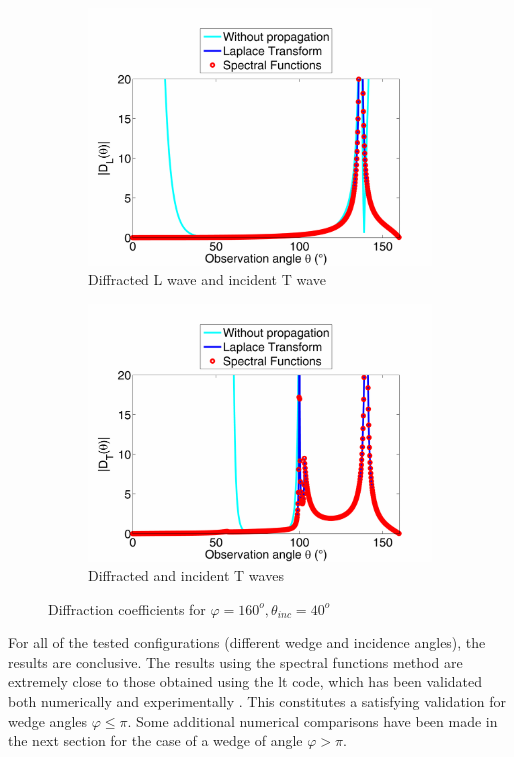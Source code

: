 \begin{figure}
\begin{subfigure}[b]{0.44\textwidth}
        \includegraphics[width=\textwidth]{images/chapter3/Figure9c.pdf}
        \caption{Diffracted L wave and incident T wave}
    \end{subfigure}
    \begin{subfigure}[b]{0.44\textwidth}
        \includegraphics[width=\textwidth]{images/chapter3/Figure9d.pdf}
        \caption{Diffracted and incident T waves}
     \end{subfigure}
     \caption{Diffraction coefficients for $\varphi=160^o, \theta_{inc}=40^o$}
     \label{16040}
\end{figure}

For all of the tested configurations (different wedge and incidence angles), the results are conclusive. The results using the spectral functions method are extremely close to those obtained using the \acrshort{lt} code, which has been validated both numerically and experimentally \cite{GautesenFradkin, ChapmanBurch}. This constitutes a satisfying validation for wedge angles $\varphi \leq \pi$. Some additional numerical comparisons have been made in the next section for the case of a wedge of angle $\varphi>\pi$.

